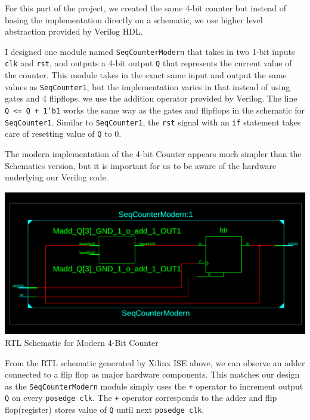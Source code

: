 \documentclass{article}
\begin{document}
\begin{enumerate}
    For this part of the project, we created the same 4-bit counter but instead of basing the implementation directly on a schematic, we use higher level abstraction provided by Verilog HDL.\par
    I designed one module named \texttt{SeqCounterModern} that takes in two 1-bit inputs \texttt{clk} and \texttt{rst}, and outputs a 4-bit output \texttt{Q} that represents the current value of the counter. This module takes in the exact same input and output the same values as \texttt{SeqCounter1}, but the implementation varies in that instead of using gates and 4 flipflops, we use the addition operator provided by Verilog. The line \\ \texttt{Q <= Q + 1'b1} works the same way as the gates and flipflops in the schematic for \texttt{SeqCounter1}. Similar to \texttt{SeqCounter1}, the \texttt{rst} signal with an \texttt{if} statement takes care of resetting value of \texttt{Q} to 0. \par
    The modern implementation of the 4-bit Counter appears much simpler than the Schematics version, but it is important for us to be aware of the hardware underlying our Verilog code.
    \begin{center}
            \includegraphics[scale=0.25]{seqcircuitschema2.png} \\
            \caption{RTL Schematic for Modern 4-Bit Counter}
    \end{center}
    From the RTL schematic generated by Xilinx ISE above, we can observe an adder connected to a flip flop as major hardware components. This matches our design as the \texttt{SeqCounterModern} module simply uses the \texttt{+} operator to increment output \texttt{Q} on every \texttt{posedge clk}. The \texttt{+} operator corresponds to the adder and flip flop(register) stores value of \texttt{Q} until next \texttt{posedge clk}.
    

\end{enumerate}
\end{document}
